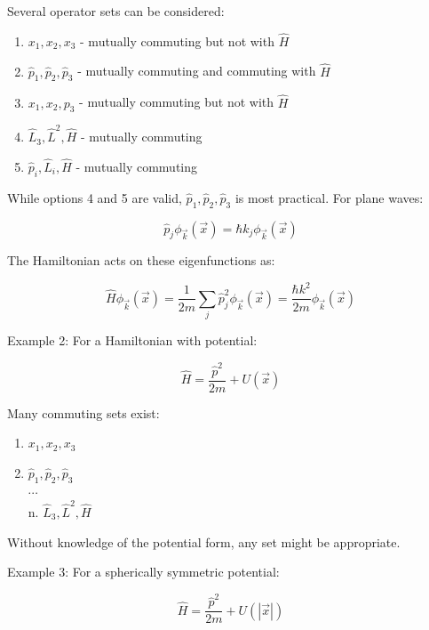 Several operator sets can be considered:
\begin{enumerate}
  \item $x_{1}, x_{2}, x_{3}$ - mutually commuting but not with $\hat{H}$
  \item $\hat{p}_{1}, \hat{p}_{2}, \hat{p}_{3}$ - mutually commuting and commuting with $\hat{H}$
  \item $x_{1}, x_{2}, p_{3}$ - mutually commuting but not with $\hat{H}$
  \item $\hat{L}_{3}, \hat{L}^{2}, \hat{H}$ - mutually commuting
  \item $\hat{p}_{i}, \hat{L}_{i}, \hat{H}$ - mutually commuting
\end{enumerate}

While options 4 and 5 are valid, $\hat{p}_{1}, \hat{p}_{2}, \hat{p}_{3}$ is most practical. For plane waves:

\begin{equation}
\hat{p}_{j} \phi_{\vec{k}}(\vec{x})=\hbar k_{j} \phi_{\vec{k}}(\vec{x})
\end{equation}

The Hamiltonian acts on these eigenfunctions as:

\begin{equation}
\hat{H} \phi_{\vec{k}}(\vec{x})=\frac{1}{2 m} \sum_{j} \hat{p}_{j}^{2} \phi_{\vec{k}}(\vec{x})=\frac{\hbar k^{2}}{2 m} \phi_{\vec{k}}(\vec{x})
\end{equation}

Example 2: For a Hamiltonian with potential:

\begin{equation}
\hat{H}=\frac{\hat{p}^{2}}{2 m}+U(\vec{x})
\end{equation}

Many commuting sets exist:
\begin{enumerate}
  \item $x_{1}, x_{2}, x_{3}$
  \item $\hat{p}_{1}, \hat{p}_{2}, \hat{p}_{3}$\\
$\cdots$\\
n. $\hat{L}_{3}, \hat{L}^{2}, \hat{H}$
\end{enumerate}

Without knowledge of the potential form, any set might be appropriate.

Example 3: For a spherically symmetric potential:

\begin{equation}
\hat{H}=\frac{\hat{p}^{2}}{2 m}+U(|\vec{x}|)
\end{equation}

